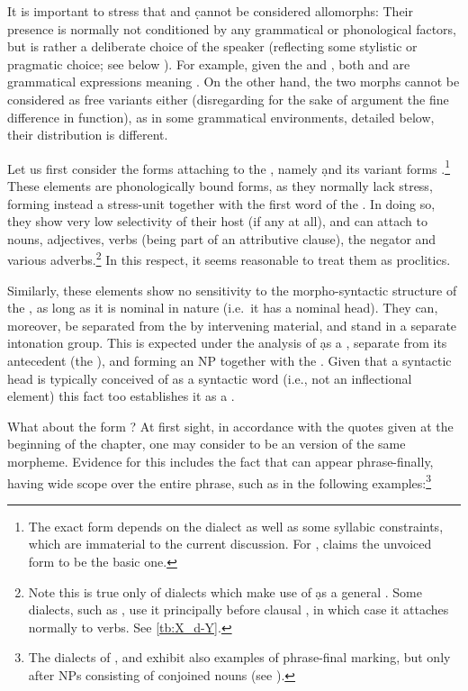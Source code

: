 It is important to stress that \ed and \d cannot be considered allomorphs: Their presence is  normally not conditioned by any grammatical or phonological factors, but is rather a deliberate choice of the speaker (reflecting some stylistic or pragmatic choice; see below ). For example, given the \Barw \prim {} and \secn {}, both  and  are grammatical expressions meaning  \citep[488]{KhanBarwar}. On the other hand, the two morphs cannot be considered as free variants either (disregarding for the sake of argument the fine difference in function), as in some grammatical environments, detailed below, their distribution is different. 



Let us first consider the forms attaching to the \secn, namely \d and its variant forms .\footnote{The exact form  depends on the dialect as well as some syllabic constraints, which are immaterial to the current discussion. For \Barw, \citet[396]{KhanBarwar} claims the unvoiced  form to be the basic one.} These elements are phonologically bound forms, as they normally lack stress, forming instead a  stress-unit together with  the first word of the \secn. In doing so, they show very low selectivity of their host (if any at all), and can attach to nouns, adjectives, verbs (being part of an attributive clause), the negator  and various adverbs.\footnote{Note this is true only of dialects which make use of \d as a general \lnk*. Some dialects, such as \JZax, use it principally before clausal \secns, in which case it attaches normally to verbs. See \vref{tb:X_d-Y}.} In this respect, it seems reasonable to treat them as  proclitics. 

Similarly, these elements  show no sensitivity to the morpho-syntactic structure of the \prim, as long as it is nominal in nature (i.e.\ it has a nominal head). They can, moreover, be separated from the \prim  by intervening material, and stand in a separate intonation group. This is expected under the analysis of \d as a , separate from its antecedent (the \prim), and forming an NP together with the \secn. Given that a syntactic head is typically conceived of as  a syntactic word (i.e., not an inflectional element) this fact too establishes it as a .  

What about the form \ed? At first sight, in accordance with the quotes given at the beginning of the chapter, one may consider \ed to be an  version of the same morpheme. Evidence for this includes the fact that \ed can appear phrase-finally, having wide scope over the entire phrase, such as in the following examples:\footnote{The dialects of \Arb, \JSul and \Qar exhibit also examples of phrase-final \ed marking, but only after NPs consisting of conjoined nouns (see ).}

